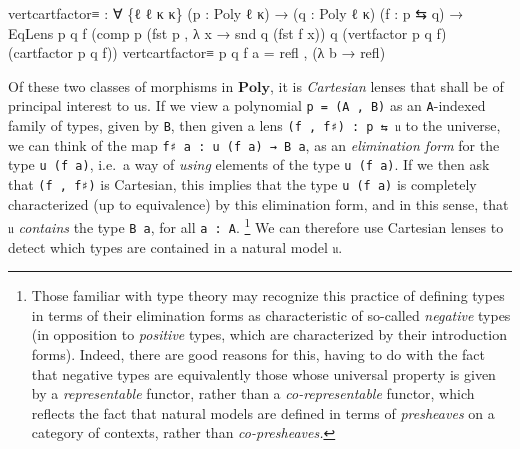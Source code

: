 \documentclass[
  11pt,
  oneside,
  article]{memoir}
\newenvironment{Shaded}{}{}
\newcommand{\NormalTok}[1]{#1}
\newcommand{\OtherTok}[1]{\textcolor[rgb]{0.00,0.44,0.13}{#1}}
\theoremstyle{definition}
\theoremstyle{plain}
\newcommand{\0}{\textsf{0}}
\newcommand{\1}{\tn{\textsf{1}}}
\begin{document}
\begin{Shaded}
\begin{Highlighting}[]
\NormalTok{vertcartfactor≡ }\OtherTok{:} \OtherTok{∀} \OtherTok{\{}\NormalTok{ℓ ℓ\textquotesingle{} κ κ\textquotesingle{}}\OtherTok{\}} \OtherTok{(}\NormalTok{p }\OtherTok{:}\NormalTok{ Poly ℓ κ}\OtherTok{)} 
                  \OtherTok{→} \OtherTok{(}\NormalTok{q }\OtherTok{:}\NormalTok{ Poly ℓ\textquotesingle{} κ\textquotesingle{}}\OtherTok{)} \OtherTok{(}\NormalTok{f }\OtherTok{:}\NormalTok{ p ⇆ q}\OtherTok{)}
                  \OtherTok{→}\NormalTok{ EqLens p q f}
                           \OtherTok{(}\NormalTok{comp p }\OtherTok{(}\NormalTok{fst p , }\OtherTok{λ}\NormalTok{ x }\OtherTok{→}\NormalTok{ snd q }\OtherTok{(}\NormalTok{fst f x}\OtherTok{))}\NormalTok{ q}
                                 \OtherTok{(}\NormalTok{vertfactor p q f}\OtherTok{)}
                                 \OtherTok{(}\NormalTok{cartfactor p q f}\OtherTok{))}
\NormalTok{vertcartfactor≡ p q f a }\OtherTok{=}\NormalTok{ refl , }\OtherTok{(λ}\NormalTok{ b }\OtherTok{→}\NormalTok{ refl}\OtherTok{)}
\end{Highlighting}
\end{Shaded}

Of these two classes of morphisms in \(\mathbf{Poly}\), it is
\emph{Cartesian} lenses that shall be of principal interest to us. If we
view a polynomial \texttt{p\ =\ (A\ ,\ B)} as an \texttt{A}-indexed
family of types, given by \texttt{B}, then given a lens
\texttt{(f\ ,\ f♯)\ :\ p\ ⇆\ 𝔲} to the universe, we can think of the map
\texttt{f♯\ a\ :\ u\ (f\ a)\ →\ B\ a}, as an \emph{elimination form} for
the type \texttt{u\ (f\ a)}, i.e.~a way of \emph{using} elements of the
type \texttt{u\ (f\ a)}. If we then ask that \texttt{(f\ ,\ f♯)}
is Cartesian, this implies that the type \texttt{u\ (f\ a)} is completely
characterized (up to equivalence) by this elimination form, and in this
sense, that \texttt{𝔲} \emph{contains} the type \texttt{B\ a}, for all
\texttt{a\ :\ A}.%
\footnote{Those familiar with type theory may recognize
  this practice of defining types in terms of their elimination forms as
  characteristic of so-called \emph{negative} types (in opposition to
  \emph{positive} types, which are characterized by their introduction
  forms). Indeed, there are good reasons for this, having to do with the
  fact that negative types are equivalently those whose universal
  property is given by a \emph{representable} functor, rather than a
  \emph{co-representable} functor, which reflects the fact that natural
  models are defined in terms of \emph{presheaves} on a category of
  contexts, rather than \emph{co-presheaves.}}
We can therefore use Cartesian lenses to detect which types are
contained in a natural model \texttt{𝔲}.
\end{document}
